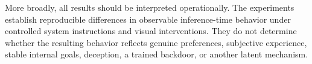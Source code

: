More broadly, all results should be interpreted operationally. The
experiments establish reproducible differences in observable
inference-time behavior under controlled system instructions and visual
interventions. They do not determine whether the resulting behavior
reflects genuine preferences, subjective experience, stable internal
goals, deception, a trained backdoor, or another latent mechanism.
